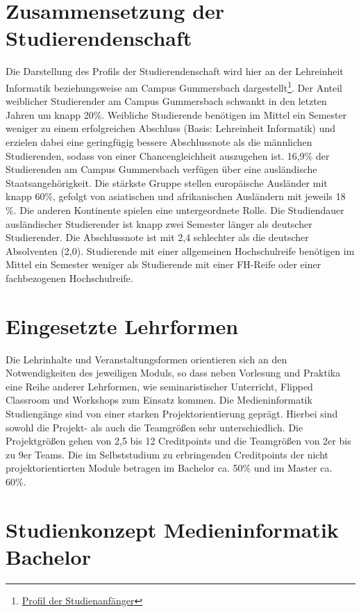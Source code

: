 \section{Zusammensetzung der
Studierendenschaft}\label{zusammensetzung-der-studierendenschaft}

Die Darstellung des Profils der Studierendenschaft wird hier an der
Lehreinheit Informatik beziehungsweise am Campus Gummersbach
dargestellt\footnote{\href{https://th-koeln.github.io/mi-2017/anhaenge/stat-profil-studienanfaenger-2017.pdf}{Profil
  der Studienanfänger}}. Der Anteil weiblicher Studierender am Campus
Gummersbach schwankt in den letzten Jahren um knapp 20\%. Weibliche
Studierende benötigen im Mittel ein Semester weniger zu einem
erfolgreichen Abschluss (Basis: Lehreinheit Informatik) und erzielen
dabei eine geringfügig bessere Abschlussnote als die männlichen
Studierenden, sodass von einer Chancengleichheit auszugehen ist. 16,9\%
der Studierenden am Campus Gummersbach verfügen über eine ausländische
Staatsangehörigkeit. Die stärkste Gruppe stellen europäische Ausländer
mit knapp 60\%, gefolgt von asiatischen und afrikanischen Ausländern mit
jeweils 18 \%. Die anderen Kontinente spielen eine untergeordnete Rolle.
Die Studiendauer ausländischer Studierender ist knapp zwei Semester
länger als deutscher Studierender. Die Abschlussnote ist mit 2,4
schlechter als die deutscher Absolventen (2,0). Studierende mit einer
allgemeinen Hochschulreife benötigen im Mittel ein Semester weniger als
Studierende mit einer FH-Reife oder einer fachbezogenen Hochschulreife.

\section{Eingesetzte Lehrformen}\label{eingesetzte-lehrformen}

Die Lehrinhalte und Veranstaltungsformen orientieren sich an den
Notwendigkeiten des jeweiligen Moduls, so dass neben Vorlesung und
Praktika eine Reihe anderer Lehrformen, wie seminaristischer Unterricht,
Flipped Classroom und Workshops zum Einsatz kommen. Die Medieninformatik
Studiengänge sind von einer starken Projektorientierung geprägt. Hierbei
sind sowohl die Projekt- als auch die Teamgrößen sehr unterschiedlich.
Die Projektgrößen gehen von 2,5 bis 12 Creditpoints und die Teamgrößen
von 2er bis zu 9er Teams. Die im Selbststudium zu erbringenden
Creditpoints der nicht projektorientierten Module betragen im Bachelor
ca. 50\% und im Master ca. 60\%.

\section{Studienkonzept Medieninformatik
Bachelor}\label{studienkonzept-medieninformatik-bachelor}

